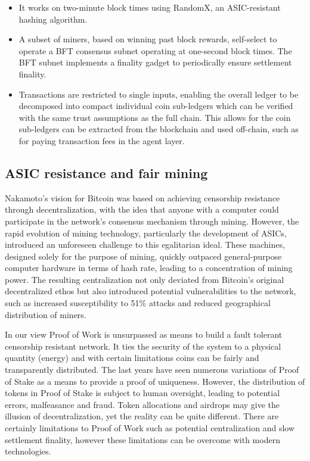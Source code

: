 \documentclass{article}
\begin{document}
\begin{itemize}
 \item It works on two-minute block times using RandomX, an ASIC-resistant hashing algorithm.
 \item A subset of miners, based on winning past block rewards, self-select to operate a BFT consensus subnet operating at one-second block times. The BFT subnet implements a finality gadget to periodically ensure settlement finality.
 \item Transactions are restricted to single inputs, enabling the overall ledger to be decomposed into compact individual coin sub-ledgers which can be verified with the same trust assumptions as the full chain.  This allows for the coin sub-ledgers can be extracted from the blockchain and used off-chain, such as for paying transaction fees in the agent layer.
\end{itemize}


\subsection{ASIC resistance and fair mining}

Nakamoto's vision for Bitcoin was based on achieving censorship resistance through decentralization, with the idea that anyone with a computer could participate in the network's consensus mechanism through mining. However, the rapid evolution of mining technology, particularly the development of ASICs, introduced an unforeseen challenge to this egalitarian ideal. These machines, designed solely for the purpose of mining, quickly outpaced general-purpose computer hardware in terms of hash rate, leading to a concentration of mining power. The resulting centralization not only deviated from Bitcoin's original decentralized ethos but also introduced potential vulnerabilities to the network, such as increased susceptibility to 51\% attacks and reduced geographical distribution of miners.

In our view Proof of Work is unsurpassed as means to build a fault tolerant censorship resistant network. It ties the security of the system to a physical quantity (energy) and with certain limitations coins can be fairly and transparently distributed. The last years have seen numerous variations of Proof of Stake as a means to provide a proof of uniqueness. However, the distribution of tokens in Proof of Stake is subject to human oversight, leading to potential errors, malfeasance and fraud. Token allocations and airdrops may give the illusion of decentralization, yet the reality can be quite different. There are certainly limitations to Proof of Work such as potential centralization and slow settlement finality, however these limitations can be overcome with modern technologies.
\end{document}
